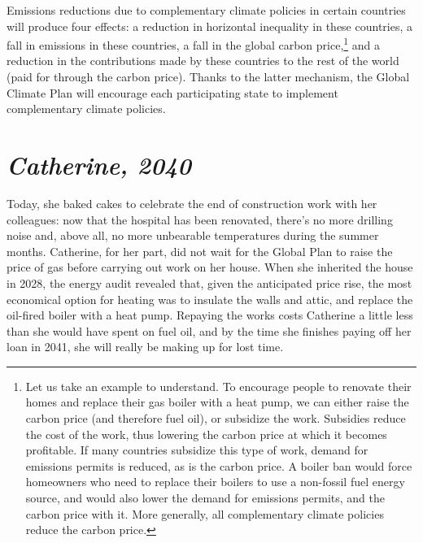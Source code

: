\documentclass[a5paper,english,openany]{memoir}
\begin{document}
Emissions reductions due to complementary climate policies in certain countries 
will produce four effects: a reduction in horizontal inequality in these countries, a fall in emissions in these countries, a fall in the global carbon price,\footnote{Let us take an example to understand. 
To encourage people to renovate their homes and replace their gas boiler with a heat pump, we can either raise the carbon price (and therefore fuel oil), or subsidize %
the work. 
Subsidies reduce the cost of the work, thus lowering the carbon price at which it becomes profitable. 
If many countries subsidize %
this type of work, demand for emissions permits is reduced, as is the carbon price. 
A boiler ban would force homeowners who need to replace their boilers to use a non-fossil fuel energy source, and would also lower the demand for emissions permits, and the carbon price with it. More generally, all complementary climate policies reduce the carbon price.} 
and a reduction in the contributions made by these countries to the rest of the world (paid for through the carbon price). Thanks to the latter mechanism, the Global Climate Plan will %
encourage each participating state to implement complementary climate policies.
\chapter*{\textit{Catherine, 2040}}\label{ch:narr_poitiers2}

 Today, she baked cakes to celebrate the end of construction work with her colleagues: now that the hospital has been renovated, there's no more drilling noise and, above all, no more unbearable temperatures during the summer months. Catherine, for her part, did not wait for the Global Plan to raise the price of gas before carrying out work on her house. When she inherited the house in 2028, the energy audit revealed that, given the anticipated price rise, the most economical option for heating was to insulate the walls and attic, and replace the oil-fired boiler with a heat pump. Repaying the works costs Catherine a little less than she would have spent on fuel oil, and by the time she finishes paying off her loan in 2041, she will really be making up for lost time. 
\end{document}
